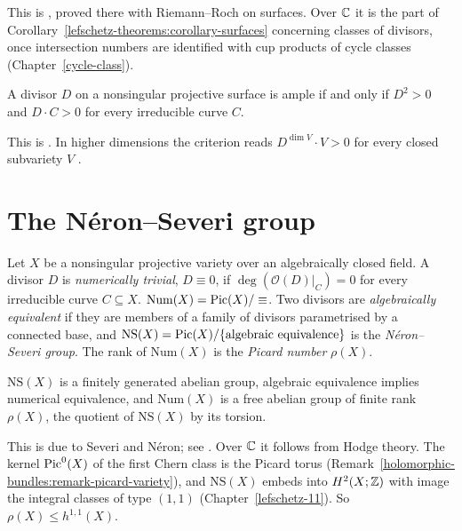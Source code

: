 This is \cite[Theorem V.1.9]{hartshorne-ag}, proved there with Riemann--Roch on surfaces. Over $\mathbb{C}$ it is the part of
Corollary~\ref{lefschetz-theorems:corollary-surfaces} concerning classes of divisors, once intersection numbers are identified with cup products of cycle classes
(Chapter~\ref{cycle-class}).

\begin{theorem}\label{divisors:theorem-nakai}
A divisor $D$ on a nonsingular projective surface is ample if and only if $D^2 > 0$ and $D \cdot C > 0$ for every irreducible curve $C$.
\end{theorem}

This is \cite[Theorem V.1.10]{hartshorne-ag}. In higher dimensions the criterion reads $D^{\dim V} \cdot V > 0$ for every closed subvariety $V$
\cite[Theorem 1.2.23]{lazarsfeld-positivity-1}.

\section{The N\'eron--Severi group}\label{divisors:section-neron-severi}

\begin{definition}\label{divisors:definition-num}
Let $X$ be a nonsingular projective variety over an algebraically closed field. A divisor $D$ is \emph{numerically trivial}, $D \equiv 0$, if $\deg(\mathcal{O}(D)|_C) = 0$ for every
irreducible curve $C \subseteq X$. $\mathrm{Num}(X) = \operatorname{Pic}(X)/\equiv$. Two divisors are \emph{algebraically equivalent} if they are members of a family of divisors
parametrised by a connected base, and $\mathrm{NS}(X) = \operatorname{Pic}(X)/\{\text{algebraic equivalence}\}$ is the \emph{N\'eron--Severi group}. The rank of $\mathrm{Num}(X)$
is the \emph{Picard number} $\rho(X)$.
\end{definition}

\begin{theorem}\label{divisors:theorem-base}
$\mathrm{NS}(X)$ is a finitely generated abelian group, algebraic equivalence implies numerical equivalence, and $\mathrm{Num}(X)$ is a free abelian group of finite rank
$\rho(X)$, the quotient of $\mathrm{NS}(X)$ by its torsion.
\end{theorem}

This is due to Severi and N\'eron; see \cite[Section 1.1]{lazarsfeld-positivity-1}. Over $\mathbb{C}$ it follows from Hodge theory. The kernel $\operatorname{Pic}^0(X)$ of the first Chern
class is the Picard torus (Remark~\ref{holomorphic-bundles:remark-picard-variety}), and $\mathrm{NS}(X)$ embeds into $H^2(X; \mathbb{Z})$ with image the integral classes of type
$(1,1)$ (Chapter~\ref{lefschetz-11}). So $\rho(X) \leq h^{1,1}(X)$.

